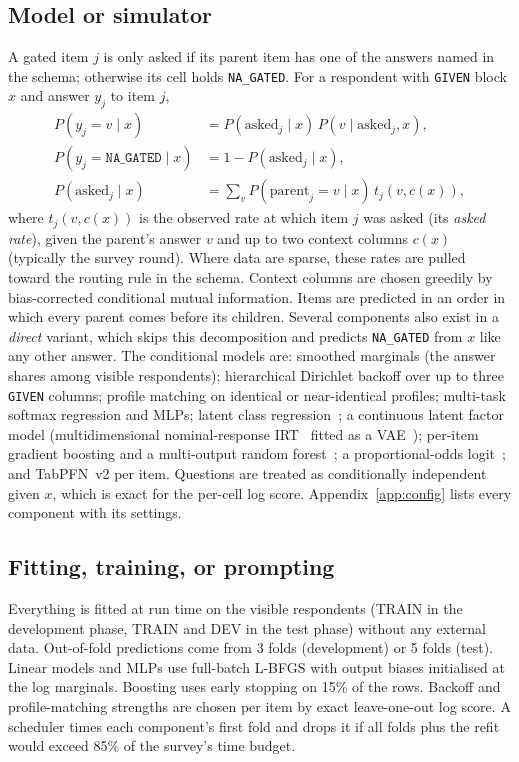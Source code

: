 \documentclass{article}
\begin{document}
\subsection{Model or simulator}
\label{sec:model}
A gated item $j$ is only asked if its parent item has one of the answers named in the schema;
otherwise its cell holds \texttt{NA\_GATED}. For a respondent with \texttt{GIVEN} block $x$ and
answer $y_j$ to item $j$,
\begin{align*}
P(y_j = v \mid x) &= P(\text{asked}_j \mid x)\, P(v \mid \text{asked}_j, x),\\
P(y_j = \texttt{NA\_GATED} \mid x) &= 1 - P(\text{asked}_j \mid x),\\
P(\text{asked}_j \mid x) &= \textstyle\sum_v P(\text{parent}_j = v \mid x)\, t_j(v, c(x)),
\end{align*}
where $t_j(v, c(x))$ is the observed rate at which item $j$ was asked (its \emph{asked rate}), given the parent's answer $v$
and up to two context columns $c(x)$ (typically the survey round). Where data are sparse, these
rates are pulled toward the routing rule in the schema. Context columns are chosen greedily by
bias-corrected conditional mutual information. Items are predicted in an order in which every
parent comes before its children. Several
components also exist in a \emph{direct} variant, which skips this decomposition and predicts
\texttt{NA\_GATED} from $x$ like any other answer. The conditional models are: smoothed marginals (the answer shares among visible respondents); hierarchical Dirichlet backoff over up to
three \texttt{GIVEN} columns; profile matching on identical or near-identical profiles; multi-task
softmax regression and MLPs; latent class regression~\citep{dayton1988concomitant}; a continuous
latent factor model (multidimensional nominal-response IRT~\citep{bock1972nominal} fitted as a
VAE~\citep{kingma2014vae}); per-item gradient boosting and a multi-output random
forest~\citep{breiman2001rf,pedregosa2011sklearn}; a proportional-odds
logit~\citep{mccullagh1980ordinal}; and TabPFN~v2 per item. Questions are treated as conditionally
independent given $x$, which is exact for the per-cell log score. Appendix~\ref{app:config} lists
every component with its settings.

\subsection{Fitting, training, or prompting}
\label{sec:fit}
Everything is fitted at run time on the visible respondents (TRAIN in the development phase, TRAIN and DEV
in the test phase) without any external data. Out-of-fold predictions come from 3 folds
(development) or 5 folds (test). Linear models and MLPs use full-batch L-BFGS with output biases
initialised at the log marginals. Boosting uses early stopping on 15\% of the rows. Backoff and
profile-matching strengths are chosen per item by exact leave-one-out log score. A scheduler times each component's first fold
and drops it if all folds plus the refit would exceed 85\% of the survey's time budget.
\end{document}
